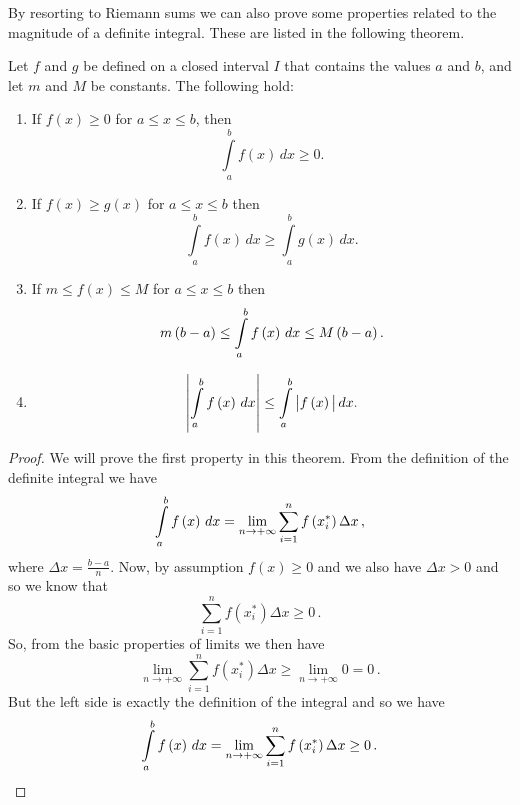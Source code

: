 By resorting to Riemann sums we can also prove some properties related to the magnitude of a definite integral. These are listed in the following theorem.

\begin{theorem}
Let $f$ and $g$ be defined on a closed interval $I$ that contains the values $a$ and $b$, and let $m$ and $M$ be constants. The following hold:
\begin{enumerate}
    \item If $f(x)\geq0$ for $a\leq x\leq b$, then
    $$
    \displaystyle \int\limits_{{\,a}}^{{\,b}}{{f\left( x \right)\,dx}} \ge 0.
    $$
    \item If $f(x)\geq g(x)$ for $a\leq x\leq b$ then
    $$
    \displaystyle \int\limits_{{\,a}}^{{\,b}}{{f\left( x \right)\,dx}} \ge \int\limits_{{\,a}}^{{\,b}}{{g\left( x \right)\,dx}}.
    $$
    \item If $m\leq f(x)\leq M$ for $a\leq x\leq b$ then 
    $$
    m\left( {b - a} \right) \le \displaystyle\int\limits_{{\,a}}^{{\,b}}{{f\left( x \right)\,dx}} \le M\left( {b - a} \right).
    $$
    \item 
    $$
    \left| {\displaystyle\int\limits_{{\,a}}^{{\,b}}{{f\left( x \right)\,dx}}} \right| \le \int\limits_{{\,a}}^{{\,b}}{{\left| {f\left( x \right)\,} \right|dx}}.
    $$
\end{enumerate}
\end{theorem}

\begin{proof}
We will prove the first property in this theorem. From the definition of the definite integral we have
$$
\displaystyle\int\limits_{{\,a}}^{{\,b}}{{f\left( x \right)\,dx}} = \lim_{n \to +\infty } \sum\limits_{i = 1}^n {f\left( {x_i^*} \right)\Delta x}\,,
$$
where $\Delta x = \frac{{b - a}}{n}$. Now, by assumption $f(x)\geq0$ and we also have $\Delta x>0$ and so we know that
$$
\sum\limits_{i = 1}^n {f\left( {x_i^*} \right)\Delta x}  \ge 0\,.
$$
So, from the basic properties of limits we then have
$$
\mathop {\lim }\limits_{n \to +\infty } \sum\limits_{i = 1}^n {f\left( {x_i^*} \right)\Delta x}  \ge \mathop {\lim }\limits_{n \to +\infty } 0 = 0\,.
$$
But the left side is exactly the definition of the integral and so we have
$$
\displaystyle\int\limits_{{\,a}}^{{\,b}}{{f\left( x \right)\,dx}} = \mathop {\lim }\limits_{n \to +\infty } \sum\limits_{i = 1}^n {f\left( {x_i^*} \right)\Delta x}  \ge 0\,.
$$
\end{proof}

\fi


